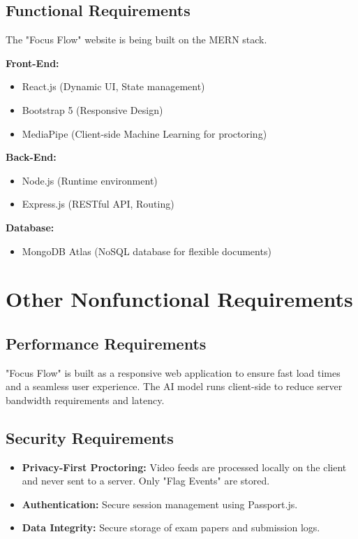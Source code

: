 \documentclass{scrreprt}
\begin{document}
\section{Functional Requirements}
The "Focus Flow" website is being built on the MERN stack.

\textbf{Front-End:}
\begin{itemize}
    \item React.js (Dynamic UI, State management)
    \item Bootstrap 5 (Responsive Design)
    \item MediaPipe (Client-side Machine Learning for proctoring)
\end{itemize}
\textbf{Back-End:}
\begin{itemize}
    \item Node.js (Runtime environment)
    \item Express.js (RESTful API, Routing)
\end{itemize}
\textbf{Database:}
\begin{itemize}
    \item MongoDB Atlas (NoSQL database for flexible documents)
\end{itemize}

\chapter{Other Nonfunctional Requirements}

\section{Performance Requirements}
"Focus Flow" is built as a responsive web application to ensure fast load times and a seamless user experience. The AI model runs client-side to reduce server bandwidth requirements and latency.

\section{Security Requirements}
\begin{itemize}
    \item \textbf{Privacy-First Proctoring:} Video feeds are processed locally on the client and never sent to a server. Only "Flag Events" are stored.
    \item \textbf{Authentication:} Secure session management using Passport.js.
    \item \textbf{Data Integrity:} Secure storage of exam papers and submission logs.
\end{itemize}
\end{document}
